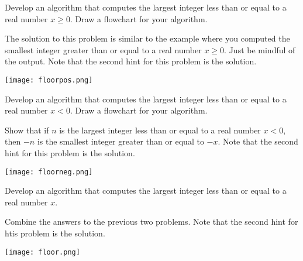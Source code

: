 \documentclass{ximera}
\begin{document}
\begin{question}
	Develop an algorithm that computes the largest integer less than or equal to a real number $x\geq 0$. Draw a flowchart for your algorithm.
	\begin{hint}
		The solution to this problem is similar to the example where you computed the smallest integer greater than or equal to a real number $x\geq 0$. Just be mindful of the output. Note that the second hint for this problem is the solution.
	\end{hint}
	\begin{hint}
		\begin{center}
			\texttt{[image: floorpos.png]}
		\end{center}
	\end{hint}
\end{question}

\begin{question}
	Develop an algorithm that computes the largest integer less than or equal to a real number $x<0$. Draw a flowchart for your algorithm.
	\begin{hint}
		Show that if $n$ is the largest integer less than or equal to a real number $x<0$, then $-n$ is the smallest integer greater than or equal to $-x$. Note that the second hint for this problem is the solution.
	\end{hint}
	\begin{hint}
		\begin{center}
			\texttt{[image: floorneg.png]}
		\end{center}
	\end{hint}
\end{question}

\begin{question}
	Develop an algorithm that computes the largest integer less than or equal to a real number $x$.
	\begin{hint}
		Combine the answers to the previous two problems. Note that the second hint for htis problem is the solution.
	\end{hint}
	\begin{hint}
		\begin{center}
			\texttt{[image: floor.png]}
		\end{center}
	\end{hint}
\end{question}
\end{document}
